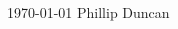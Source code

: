 \documentclass[11pt, letterpaper]{awesome-cv}
\begin{document}
\makecvheader

\makecvfooter
  {\today}
  {Phillip Duncan}
  {\thepage}



%  
%  
%  
\begin{multicols}{2}
  
%  
\end{multicols}
\end{document}
